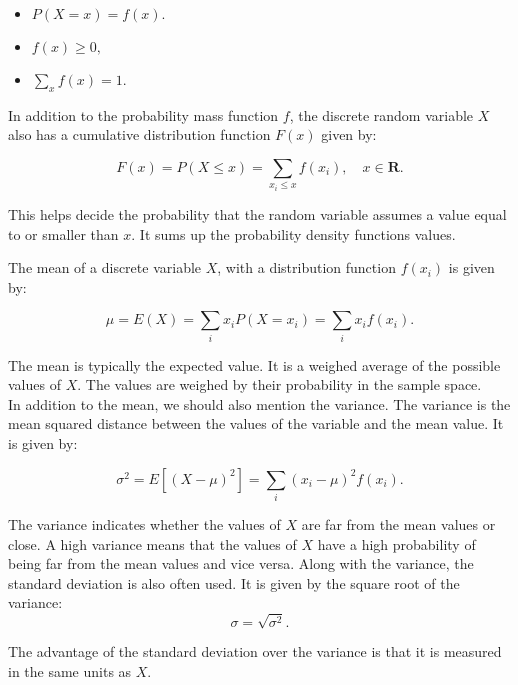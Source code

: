 \begin{itemize}
	\item $P(X = x) = f(x).$
	\item $f(x) \geq 0,$
	\item $\sum_x f(x) = 1.$
\end{itemize}

\noindent In addition to the probability mass function $f$, the discrete random variable $X$ also has a cumulative distribution function $F(x)$ given by:

\begin{equation}
F(x) = P(X \leq x) = \sum_{x_i \leq x} f(x_i), \quad x \in \textbf{R}.
\end{equation}


\noindent This helps decide the probability that the random variable assumes a value equal to or smaller than $x$. It sums up the probability density functions values.
\newline

\noindent The mean of a discrete variable $X$, with a distribution function $f(x_{i})$ is given by:

\begin{equation}
\mu = E(X) = \sum_i x_i P(X = x_i) = \sum_i x_i f(x_i).
\end{equation}

\noindent The mean is typically the expected value. It is a weighed average of the possible values of $X$. The values are weighed by their probability in the sample space.
\\

\noindent In addition to the mean, we should also mention the variance. The variance is the mean squared distance between the values of the variable and the mean value. It is given by:

\begin{equation}
\sigma^2 = E\left[(X - \mu)^2\right] = \sum_{i} (x_i - \mu)^2 f(x_i).
\end{equation}

\noindent The variance indicates whether the values of $X$ are far from the mean values or close. A high variance means that the values of $X$ have a high probability of being far from the mean values and vice versa. Along with the variance, the standard deviation is also often used. It is given by the square root of the variance:
\begin{equation}
\sigma=\sqrt{\sigma^2}.
\end{equation}

\noindent The advantage of the standard deviation over the variance is that it is measured in the same units as $X$.

